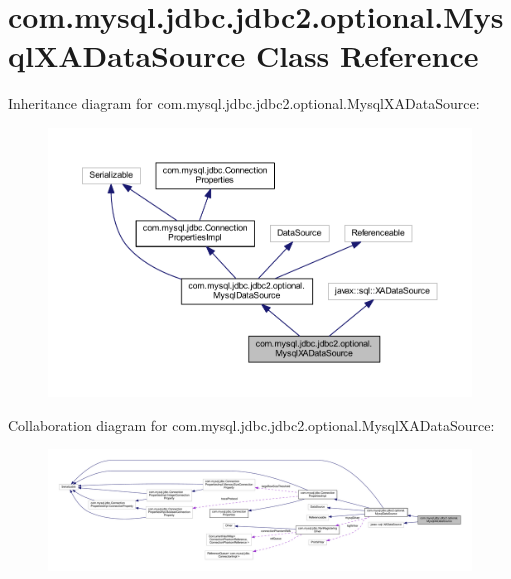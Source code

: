 \hypertarget{classcom_1_1mysql_1_1jdbc_1_1jdbc2_1_1optional_1_1_mysql_x_a_data_source}{}\section{com.\+mysql.\+jdbc.\+jdbc2.\+optional.\+Mysql\+X\+A\+Data\+Source Class Reference}
\label{classcom_1_1mysql_1_1jdbc_1_1jdbc2_1_1optional_1_1_mysql_x_a_data_source}


Inheritance diagram for com.\+mysql.\+jdbc.\+jdbc2.\+optional.\+Mysql\+X\+A\+Data\+Source\+:
\nopagebreak
\begin{figure}[H]
\begin{center}
\leavevmode
\includegraphics[width=350pt]{classcom_1_1mysql_1_1jdbc_1_1jdbc2_1_1optional_1_1_mysql_x_a_data_source__inherit__graph}
\end{center}
\end{figure}


Collaboration diagram for com.\+mysql.\+jdbc.\+jdbc2.\+optional.\+Mysql\+X\+A\+Data\+Source\+:
\nopagebreak
\begin{figure}[H]
\begin{center}
\leavevmode
\includegraphics[width=350pt]{classcom_1_1mysql_1_1jdbc_1_1jdbc2_1_1optional_1_1_mysql_x_a_data_source__coll__graph}
\end{center}
\end{figure}
